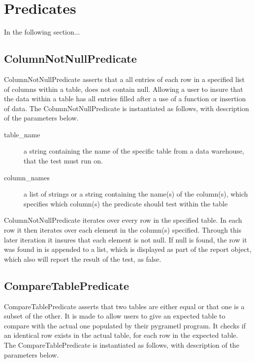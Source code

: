 \section{Predicates}
In the following section...

\subsection{ColumnNotNullPredicate}
ColumnNotNullPredicate asserts that a all entries of each row in a specified list of columns within a table, does not contain null. Allowing a user to insure that the data within a table has all entries filled after a use of a function or insertion of data.
The ColumnNotNullPredicate is instantiated as follows, with description of the parameters below.


\begin{description}
\item [table\_name] a string containing the name of the specific table from a data warehouse, that the test must run on. 
\item [column\_names] a list of strings or a string containing the name(s) of the column(s), which specifies which column(s) the predicate should test within the table
\end{description}

ColumnNotNullPredicate iterates over every row in the specified table. In each row it then iterates over each element in the column(s) specified. Through this later iteration it insures that each element is not null. If null is found, the row it was found in is appended to a list, which is displayed as part of the report object, which also will report the result of the test, as false.

\subsection{CompareTablePredicate}
CompareTablePredicate asserts that two tables are either equal or that one is a subset of the other. It is made to allow users to give an expected table to compare with the actual one populated by their pygrametl program. It checks if an identical row exists in the actual table, for each row in the expected table. The CompareTablePredicate is instantiated as follows, with description of the parameters below.


